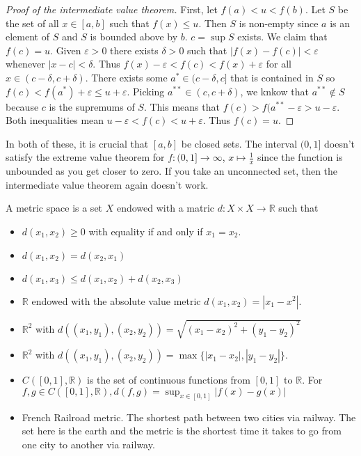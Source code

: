 \documentclass{article}
\newcommand{\R}{\mathbb{R}}
\newcommand{\eps}{\varepsilon}
\newcommand{\ra}[1][]{\xrightarrow{#1}}
\begin{document}
\begin{proof}[Proof of the intermediate value theorem]
First, let $f(a)<u<f(b)$. Let $S$ be the set of all $x\in[a,b]$ such that $f(x)\leq u$. Then $S$ is non-empty since $a$ is an element of $S$ and $S$ is bounded above by $b$. $c=\sup S$ exists. We claim that $f(c)=u$. Given $\eps>0$ there exists $\delta>0$ such that $|f(x)-f(c)|<\eps$ whenever $|x-c|<\delta$. Thus $f(x)-\eps<f(c)<f(x)+\eps$ for all $x\in (c-\delta,c+\delta)$. There exists some $a^*\in (c-\delta,c]$ that is contained in $S$ so $f(c)<f(a^*)+\eps\leq u+\eps$. Picking $a^{**}\in(c,c+\delta)$, we knkow that $a^{**}\notin S$ because $c$ is the supremums of $S$. This means that $f(c)>f(a^{**}-\eps>u-\eps$. Both  inequalities mean $u-\eps<f(c)<u+\eps$. Thus $f(c)=u$.
\end{proof}
In both of these, it is crucial that $[a,b]$ be closed sets. The interval $(0,1]$ doesn't satisfy the extreme value theorem for $f:(0,1]\ra\infty$, $x\mapsto \frac{1}{x}$ since the function is unbounded as you get closer to zero. If you take an unconnected set, then the intermediate value theorem again doesn't work.
\begin{definition}
A metric space is a set $X$ endowed with a matric $d:X\times X\ra \R$ such that
\begin{itemize}
    \item $d(x_1,x_2)\geq 0$ with equality if and only if $x_1=x_2$.
    \item $d(x_1,x_2)=d(x_2,x_1)$
    \item $d(x_1,x_3)\leq d(x_1,x_2)+d(x_2,x_3)$
\end{itemize}
\end{definition}
\begin{example}
\begin{itemize}
    \item $\R$ endowed with the absolute value metric $d(x_1,x_2)=|x_1-x^2|$.
    \item $\R^2$ with $d((x_1,y_1),(x_2,y_2))=\sqrt{(x_1-x_2)^2+(y_1-y_2)^2}$
    \item $\R^2$ with $d((x_1,y_1),(x_2,y_2))=\max\{|x_1-x_2|,|y_1-y_2|\}$.
    \item $C([0,1],\R)$ is the set of continuous functions from $[0,1]$ to $\R$. For \\$f,g\in C([0,1],\R), d(f,g)=\sup_{x\in[0,1]}|f(x)-g(x)|$
    \item French Railroad metric. The shortest path between two cities via railway. The set here is the earth and the metric is the shortest time it takes to go from one city to another via railway.
\end{itemize}
\end{example}
\end{document}
